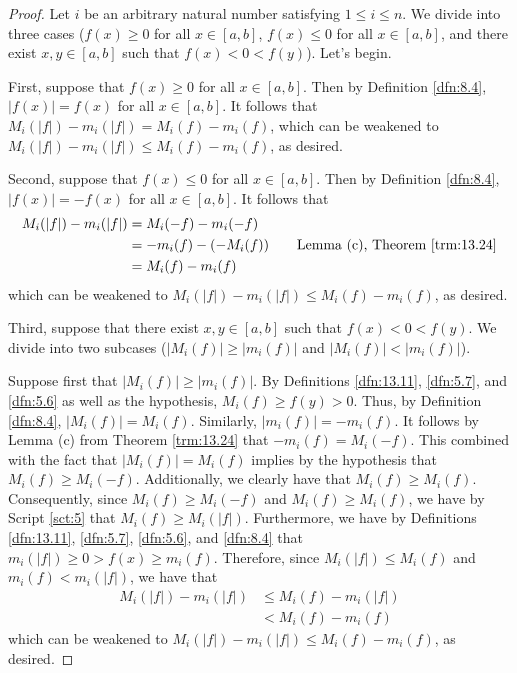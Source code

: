 \documentclass[../main.tex]{subfiles}
\begin{document}
\begin{theorem}
\begin{lemma*}
\begin{proof}
            Let $i$ be an arbitrary natural number satisfying $1\leq i\leq n$. We divide into three cases ($f(x)\geq 0$ for all $x\in[a,b]$, $f(x)\leq 0$ for all $x\in[a,b]$, and there exist $x,y\in[a,b]$ such that $f(x)<0<f(y)$). Let's begin.\par\smallskip
            First, suppose that $f(x)\geq 0$ for all $x\in[a,b]$. Then by Definition \ref{dfn:8.4}, $|f(x)|=f(x)$ for all $x\in[a,b]$. It follows that $M_i(|f|)-m_i(|f|)=M_i(f)-m_i(f)$, which can be weakened to $M_i(|f|)-m_i(|f|)\leq M_i(f)-m_i(f)$, as desired.\par\smallskip
            Second, suppose that $f(x)\leq 0$ for all $x\in[a,b]$. Then by Definition \ref{dfn:8.4}, $|f(x)|=-f(x)$ for all $x\in[a,b]$. It follows that
            \begin{align*}
                M_i(|f|)-m_i(|f|) &= M_i(-f)-m_i(-f)\\
                &= -m_i(f)-(-M_i(f))\tag*{Lemma (c), Theorem \ref{trm:13.24}}\\
                &= M_i(f)-m_i(f)
            \end{align*}
            which can be weakened to $M_i(|f|)-m_i(|f|)\leq M_i(f)-m_i(f)$, as desired.\par\smallskip
            Third, suppose that there exist $x,y\in[a,b]$ such that $f(x)<0<f(y)$. We divide into two subcases ($|M_i(f)|\geq|m_i(f)|$ and $|M_i(f)|<|m_i(f)|$).\par
            Suppose first that $|M_i(f)|\geq|m_i(f)|$. By Definitions \ref{dfn:13.11}, \ref{dfn:5.7}, and \ref{dfn:5.6} as well as the hypothesis, $M_i(f)\geq f(y)>0$. Thus, by Definition \ref{dfn:8.4}, $|M_i(f)|=M_i(f)$. Similarly, $|m_i(f)|=-m_i(f)$. It follows by Lemma (c) from Theorem \ref{trm:13.24} that $-m_i(f)=M_i(-f)$. This combined with the fact that $|M_i(f)|=M_i(f)$ implies by the hypothesis that $M_i(f)\geq M_i(-f)$. Additionally, we clearly have that $M_i(f)\geq M_i(f)$. Consequently, since $M_i(f)\geq M_i(-f)$ and $M_i(f)\geq M_i(f)$, we have by Script \ref{sct:5} that $M_i(f)\geq M_i(|f|)$. Furthermore, we have by Definitions \ref{dfn:13.11}, \ref{dfn:5.7}, \ref{dfn:5.6}, and \ref{dfn:8.4} that $m_i(|f|)\geq 0>f(x)\geq m_i(f)$. Therefore, since $M_i(|f|)\leq M_i(f)$ and $m_i(f)<m_i(|f|)$, we have that
            \begin{align*}
                M_i(|f|)-m_i(|f|) &\leq M_i(f)-m_i(|f|)\\
                &< M_i(f)-m_i(f)
            \end{align*}
            which can be weakened to $M_i(|f|)-m_i(|f|)\leq M_i(f)-m_i(f)$, as desired.\par

\end{proof}
\end{lemma*}
\end{theorem}
\end{document}
